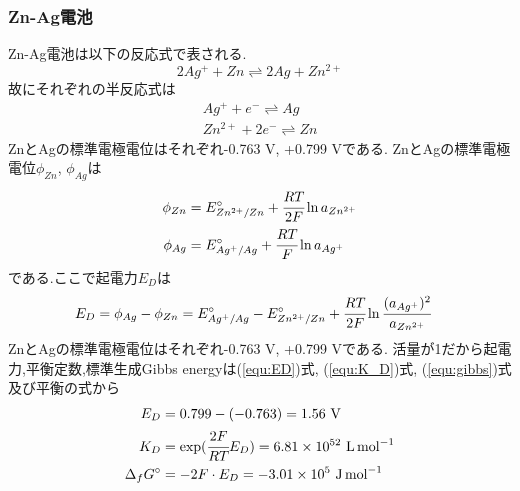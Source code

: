 \subsubsection{Zn-Ag電池}
Zn-Ag電池は以下の反応式で表される.
\begin{equation}
  2Ag^+ + Zn \rightleftharpoons 2Ag + Zn^{2+}
\end{equation}
故にそれぞれの半反応式は
\begin{align}
  Ag^+ + e^- \rightleftharpoons Ag\\
  Zn^{2+} + 2e^{-} \rightleftharpoons Zn
\end{align}
ZnとAgの標準電極電位はそれぞれ-0.763 \si{\volt}, +0.799 \si{\volt}である.
ZnとAgの標準電極電位$\phi_{Zn}$, $\phi_{Ag}$は
\begin{align}
  \phi_{Zn}&=E^{\circ}_{Zn^{2+}/Zn}+\cfrac{RT}{2F}\ln a_{Zn^{2+}}\\
  \phi_{Ag}&=E^{\circ}_{Ag^{+}/Ag}+\cfrac{RT}{F}\ln a_{Ag^{+}}
\end{align}
である.ここで起電力$E_D$は
\begin{align}
  E_D&=\phi_{Ag}-\phi_{Zn}=E^{\circ}_{Ag^{+}/Ag}-E^{\circ}_{Zn^{2+}/Zn}+\cfrac{RT}{2F} \ln \cfrac{(a_{Ag^+})^2}{a_{Zn^{2+}}}
\end{align}
ZnとAgの標準電極電位はそれぞれ-0.763 \si{\volt}, +0.799 \si{\volt}である.
活量が1だから起電力,平衡定数,標準生成Gibbs energyは(\ref{equ:ED})式, (\ref{equ:K_D})式, (\ref{equ:gibbs})式及び平衡の式から
\begin{align*}
  E_D&=0.799-(-0.763)=1.56\ \si{\volt}\\
  K_D&=\exp(\cfrac{2F}{RT}E_D)=6.81\times10^{52}\ \si{L.\mole^{-1}}\\
  \Delta_fG^{\circ}&=-2F\cdot E_D=-3.01\times10^5\ \si{\joule.\mole^{-1}}
\end{align*}



